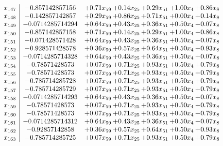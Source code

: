 \documentclass[8pt]{article}
\begin{document}
\[\begin{array}{c| c c@{\hskip 2pt} c@{\hskip 2pt} c@{\hskip 2pt} c@{\hskip 2pt} c@{\hskip 2pt} }
 x_{147}   &  -0.857142857156 & +  0.71 x_{59} & +  0.14 x_{25} & +  0.29 x_{51} & +  1.00 x_{4} & +  0.86 x_{8}\\
 x_{148}   &  -0.142857142857 & +  0.29 x_{59} & +  0.86 x_{25} & +  0.71 x_{51} & +  0.00 x_{4} & +  0.14 x_{8}\\
 x_{149}   &  -0.0714285714294 & +  0.64 x_{59} & +  0.43 x_{25} & +  0.36 x_{51} & +  0.50 x_{4} & +  0.07 x_{8}\\
 x_{150}   &  -0.857142857158 & +  0.71 x_{59} & +  0.14 x_{25} & +  0.29 x_{51} & +  1.00 x_{4} & +  0.86 x_{8}\\
 x_{151}   &  -0.071428571428 & +  0.64 x_{59} & +  0.43 x_{25} & +  0.36 x_{51} & +  0.50 x_{4} & +  0.07 x_{8}\\
 x_{152}   &  -0.928571428578 & +  0.36 x_{59} & +  0.57 x_{25} & +  0.64 x_{51} & +  0.50 x_{4} & +  0.93 x_{8}\\
 x_{153}   &  -0.0714285714328 & +  0.64 x_{59} & +  0.43 x_{25} & +  0.36 x_{51} & +  0.50 x_{4} & +  0.07 x_{8}\\
 x_{154}   &  -0.78571428573 & +  0.07 x_{59} & +  0.71 x_{25} & +  0.93 x_{51} & +  0.50 x_{4} & +  0.79 x_{8}\\
 x_{155}   &  -0.78571428573 & +  0.07 x_{59} & +  0.71 x_{25} & +  0.93 x_{51} & +  0.50 x_{4} & +  0.79 x_{8}\\
 x_{156}   &  -0.785714285728 & +  0.07 x_{59} & +  0.71 x_{25} & +  0.93 x_{51} & +  0.50 x_{4} & +  0.79 x_{8}\\
 x_{157}   &  -0.785714285729 & +  0.07 x_{59} & +  0.71 x_{25} & +  0.93 x_{51} & +  0.50 x_{4} & +  0.79 x_{8}\\
 x_{158}   &  -0.0714285714293 & +  0.64 x_{59} & +  0.43 x_{25} & +  0.36 x_{51} & +  0.50 x_{4} & +  0.07 x_{8}\\
 x_{159}   &  -0.78571428573 & +  0.07 x_{59} & +  0.71 x_{25} & +  0.93 x_{51} & +  0.50 x_{4} & +  0.79 x_{8}\\
 x_{160}   &  -0.78571428573 & +  0.07 x_{59} & +  0.71 x_{25} & +  0.93 x_{51} & +  0.50 x_{4} & +  0.79 x_{8}\\
 x_{161}   &  -0.0714285714312 & +  0.64 x_{59} & +  0.43 x_{25} & +  0.36 x_{51} & +  0.50 x_{4} & +  0.07 x_{8}\\
 x_{162}   &  -0.92857142858 & +  0.36 x_{59} & +  0.57 x_{25} & +  0.64 x_{51} & +  0.50 x_{4} & +  0.93 x_{8}\\
 x_{163}   &  -0.785714285725 & +  0.07 x_{59} & +  0.71 x_{25} & +  0.93 x_{51} & +  0.50 x_{4} & +  0.79 x_{8}\\

\end{array}\]
\end{document}
